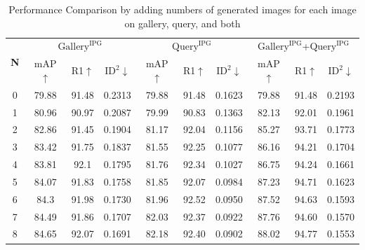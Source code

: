 \begin{table}
\small
    \centering
    \renewcommand{\arraystretch}{1}
    \renewcommand\tabcolsep{2pt}
    \begin{tabular}{c|ccc|ccc|ccc}
        \hline
        \multirow{2}{*}{\textbf{N}} & \multicolumn{3}{c|}{$\text{Gallery}^\text{IPG}$} & \multicolumn{3}{c|}{$\text{Query}^\text{IPG}$} & \multicolumn{3}{c}{$\text{Gallery}^\text{IPG}$+$\text{Query}^\text{IPG}$} \\ \cline{2-10}
          & mAP$\uparrow$ & R1$\uparrow$ & $\text{ID}^2$$\downarrow$ & mAP$\uparrow$ & R1$\uparrow$ & $\text{ID}^2$$\downarrow$ & mAP$\uparrow$ & R1$\uparrow$ & $\text{ID}^2$$\downarrow$ \\ \hline
        0 & 79.88 & 91.48 & 0.2313 & 79.88 & 91.48 & 0.1623 & 79.88 & 91.48 & 0.2193 \\
        1 & 80.96 & 90.97 & 0.2087 & 79.99 & 90.83 & 0.1363 & 82.13 & 92.01 & 0.1961 \\
        2 & 82.86 & 91.45 & 0.1904 & 81.17 & 92.04 & 0.1156 & 85.27 & 93.71 & 0.1773 \\
        3 & 83.42 & 91.75 & 0.1837 & 81.55 & 92.25 & 0.1077 & 86.16 & 94.21 & 0.1704 \\
        4 & 83.81 & 92.1  & 0.1795 & 81.76 & 92.34 & 0.1027 & 86.75 & 94.24 & 0.1661 \\
        5 & 84.07 & 91.83 & 0.1758 & 81.85 & 92.07 & 0.0984 & 87.23 & 94.71 & 0.1623 \\
        6 & 84.3  & 91.98 & 0.1730 & 81.96 & 92.52 & 0.0950 & 87.52 & 94.63 & 0.1593 \\
        7 & 84.49 & 91.86 & 0.1707 & 82.03 & 92.37 & 0.0922 & 87.76 & 94.60 & 0.1570 \\
        \rowcolor{gray!30}
        8 & 84.65 & 92.07 & 0.1691 & 82.18 & 92.40 & 0.0902 & 88.02 & 94.77 & 0.1553 \\ \hline
    \end{tabular}
    \caption{Performance Comparison by adding numbers of generated images for each image on gallery, query, and both}
    \label{tab:num}
\end{table}

